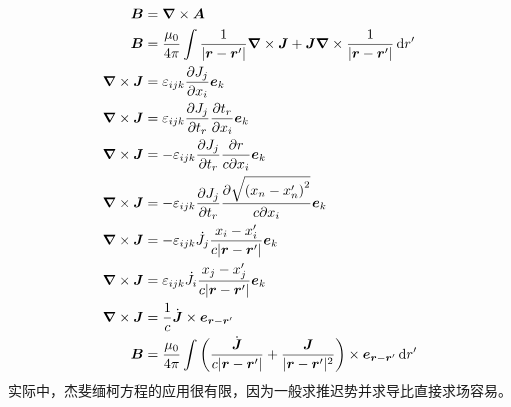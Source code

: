 \begin{align}
    \boldsymbol{B}&=\boldsymbol{\nabla}\times\boldsymbol{A}\nonumber\\
    \boldsymbol{B}&=\frac{\mu_0}{4\pi}\int\frac{1}{\vert{}\boldsymbol{r} - \boldsymbol{r}'\vert{}}\boldsymbol{\nabla}\times\boldsymbol{J}
    +\boldsymbol{J}\boldsymbol{\nabla}\times\frac{1}{\vert{}\boldsymbol{r} - \boldsymbol{r}'\vert{}}
    \dif r'\nonumber\\
    \boldsymbol{\nabla}\times\boldsymbol{J}&=\varepsilon_{ijk}\frac{\partial J_j}{\partial x_i}\boldsymbol{e}_k\nonumber\\
    \boldsymbol{\nabla}\times\boldsymbol{J}&=\varepsilon_{ijk}\frac{\partial J_j}{\partial t_r}\frac{\partial t_r}{\partial x_i}\boldsymbol{e}_k\nonumber\\
    \boldsymbol{\nabla}\times\boldsymbol{J}&=-\varepsilon_{ijk}\frac{\partial J_j}{\partial t_r}\frac{\partial r}{c\partial x_i}\boldsymbol{e}_k\nonumber\\
    \boldsymbol{\nabla}\times\boldsymbol{J}&=-\varepsilon_{ijk}\frac{\partial J_j}{\partial t_r}\frac{\partial \sqrt{\left(x_n-x_n'\right)^2}}{c\partial x_i}\boldsymbol{e}_k\nonumber\\
    \boldsymbol{\nabla}\times\boldsymbol{J}&=-\varepsilon_{ijk}\dot J_j\frac{x_i-x_i'}{c\vert{}\boldsymbol{r} - \boldsymbol{r}'\vert{}}\boldsymbol{e}_k\nonumber\\
    \boldsymbol{\nabla}\times\boldsymbol{J}&=\varepsilon_{ijk}\dot J_i\frac{x_j-x_j'}{c\vert{}\boldsymbol{r} - \boldsymbol{r}'\vert{}}\boldsymbol{e}_k\nonumber\\
    \boldsymbol\nabla \times \boldsymbol{J} &= \frac{1}{c} \dot{\boldsymbol{J}} \times \boldsymbol{e}_{\boldsymbol{r} - \boldsymbol{r}'}\\
    \boldsymbol{B}&=\frac{\mu_0}{4\pi}\int\left(\frac{\dot{\boldsymbol{J}}}{c\vert{}\boldsymbol{r} - \boldsymbol{r}'\vert{}} 
    +\frac{\boldsymbol{J}}{\vert{}\boldsymbol{r} - \boldsymbol{r}'\vert{}^2}\right)\times \boldsymbol{e}_{\boldsymbol{r} - \boldsymbol{r}'}
    \dif r'
\end{align}
实际中，杰斐缅柯方程的应用很有限，因为一般求推迟势并求导比直接求场容易。

